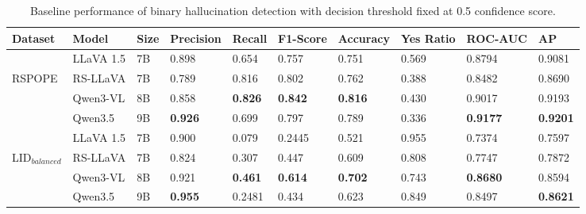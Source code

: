 \begin{table}[htb] \caption{Baseline performance of binary hallucination detection with decision threshold fixed at 0.5 confidence score.} \centering
	\centering
	\begin{tabular}{llllllllll} %
		\toprule
		Dataset          & Model     & Size & Precision      & Recall         & F1-Score       & Accuracy       & Yes Ratio & ROC-AUC         & AP              \\
		\midrule
		                 & LLaVA 1.5 & 7B   & 0.898          & 0.654          & 0.757          & 0.751          & 0.569     & 0.8794          & 0.9081          \\
		RSPOPE           & RS-LLaVA  & 7B   & 0.789          & 0.816          & 0.802          & 0.762          & 0.388     & 0.8482          & 0.8690          \\
		                 & Qwen3-VL  & 8B   & 0.858          & \textbf{0.826} & \textbf{0.842} & \textbf{0.816} & 0.430     & 0.9017          & 0.9193          \\
		                 & Qwen3.5   & 9B   & \textbf{0.926} & 0.699          & 0.797          & 0.789          & 0.336     & \textbf{0.9177} & \textbf{0.9201} \\
		\midrule
		                 & LLaVA 1.5 & 7B   & 0.900          & 0.079          & 0.2445         & 0.521          & 0.955     & 0.7374          & 0.7597          \\
		LID$_{balanced}$ & RS-LLaVA  & 7B   & 0.824          & 0.307          & 0.447          & 0.609          & 0.808     & 0.7747          & 0.7872          \\
		                 & Qwen3-VL  & 8B   & 0.921          & \textbf{0.461} & \textbf{0.614} & \textbf{0.702} & 0.743     & \textbf{0.8680} & 0.8594          \\
		                 & Qwen3.5   & 9B   & \textbf{0.955} & 0.2481         & 0.434          & 0.623          & 0.849     & 0.8497          & \textbf{0.8621} \\
		\bottomrule
	\end{tabular}
	\label{tab:enghistory_clean}
\end{table}



